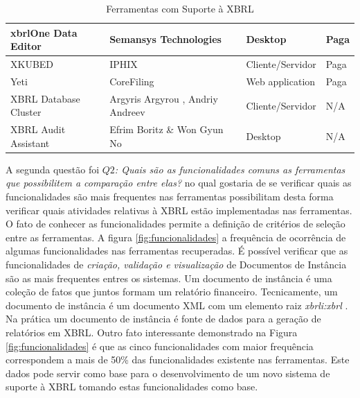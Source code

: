 \documentclass[12pt]{article}
\begin{document}
\begin{table}[htb]
{\begin{tabular}{|l|l|l|l|}
xbrlOne Data Editor                               & Semansys Technologies                       & Desktop                                   & Paga                                  \\ \hline
XKUBED                                            & IPHIX                                       & Cliente/Servidor                          & Paga                                  \\ \hline
Yeti                                              & CoreFiling                                  & Web application                           & Paga                                  \\ \hline
XBRL Database Cluster                             & Argyris Argyrou , Andriy Andreev            & Cliente/Servidor                          & N/A                                   \\ \hline
XBRL Audit Assistant                              & Efrim Boritz \& Won Gyun No                 & Desktop                                   & N/A                                   \\ \hline
\end{tabular}
}
\caption{Ferramentas com Suporte à XBRL}
\label{tab:ferramentas}
\end{table}

A segunda questão foi \textit{$Q2$: Quais são as funcionalidades comuns as ferramentas
    que possibilitem a comparação entre elas?} no qual gostaria de se verificar
  quais as funcionalidades são mais frequentes nas ferramentas possibilitam
  desta forma verificar quais atividades relativas à XBRL estão implementadas
  nas ferramentas. O fato de conhecer as funcionalidades permite a definição de
  critérios de seleção entre as ferramentas. A figura \ref{fig:funcionalidades}
  a frequência de ocorrência de algumas funcionalidades nas ferramentas
  recuperadas. É possível verificar que as funcionalidades de \textit{criação,
    validação e visualização} de Documentos de Instância são as mais frequentes
  entres os sistemas. Um documento de instância é uma coleção de fatos que
  juntos formam um relatório financeiro. Tecnicamente, um documento de
  instância é um documento XML com um elemento raiz \textit{xbrli:xbrl}
  \cite{xbrl_conceitos_aplicacoes}. Na prática um documento de instância é
  fonte de dados para a geração de relatórios em XBRL. Outro fato interessante
  demonstrado na Figura \ref{fig:funcionalidades} é que as cinco
  funcionalidades com maior frequência correspondem a mais de 50\% das
  funcionalidades existente nas ferramentas. Este dados pode servir como base
  para o desenvolvimento de um novo sistema de suporte à XBRL tomando estas
  funcionalidades como base.
\end{document}
